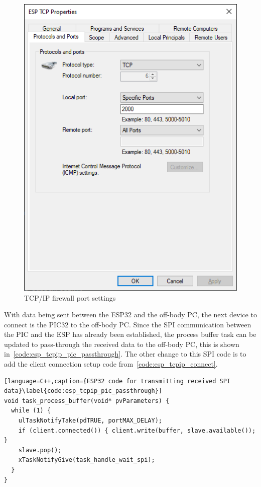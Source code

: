 \begin{figure}[!ht]
  \caption{TCP/IP firewall port settings}\label{fig:firewall}
  \centering
  \includegraphics[width=1\columnwidth/2]{chapters/development/FIREWALL}
\end{figure}

With data being sent between the ESP32 and the off-body PC, the next device to connect is the PIC32 to the off-body PC.
Since the SPI communication between the PIC and the ESP has already been established,
the process buffer task can be updated to pass-through the received data to the off-body PC, this is shown in~\autoref{code:esp_tcpip_pic_passthrough}.
The other change to this SPI code is to add the client connection setup code from~\autoref{code:esp_tcpip_connect}.

\begin{lstlisting}[language=C++,caption={ESP32 code for transmitting received SPI data}\label{code:esp_tcpip_pic_passthrough}]
void task_process_buffer(void* pvParameters) {
  while (1) {
    ulTaskNotifyTake(pdTRUE, portMAX_DELAY);
    if (client.connected()) { client.write(buffer, slave.available()); }
    slave.pop();
    xTaskNotifyGive(task_handle_wait_spi);
  }
}
\end{lstlisting}

